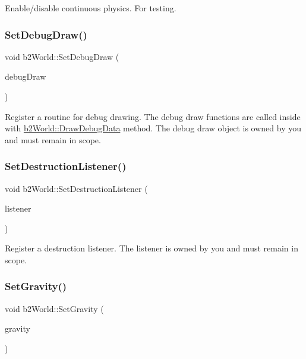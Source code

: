 Enable/disable continuous physics. For testing. 

\mbox{\label{classb2_world_a6976d2c67400df03c0d44174ffcfb7ee}} 
\subsubsection{\texorpdfstring{SetDebugDraw()}{SetDebugDraw()}}
{\footnotesize\ttfamily void b2\+World\+::\+Set\+Debug\+Draw (\begin{DoxyParamCaption}\item[{\mbox{\hyperlink{classb2_draw}{b2\+Draw}} $\ast$}]{debug\+Draw }\end{DoxyParamCaption})}

Register a routine for debug drawing. The debug draw functions are called inside with \mbox{\hyperlink{classb2_world_a293d9865e407fd463e168b0a29856acc}{b2\+World\+::\+Draw\+Debug\+Data}} method. The debug draw object is owned by you and must remain in scope. \mbox{\label{classb2_world_ae377f2dd5512ada7d27f4ad3541c75bf}} 
\subsubsection{\texorpdfstring{SetDestructionListener()}{SetDestructionListener()}}
{\footnotesize\ttfamily void b2\+World\+::\+Set\+Destruction\+Listener (\begin{DoxyParamCaption}\item[{\mbox{\hyperlink{classb2_destruction_listener}{b2\+Destruction\+Listener}} $\ast$}]{listener }\end{DoxyParamCaption})}

Register a destruction listener. The listener is owned by you and must remain in scope. \mbox{\label{classb2_world_aeafa43d6580e1dddb0675e672ca2375c}} 
\subsubsection{\texorpdfstring{SetGravity()}{SetGravity()}}
{\footnotesize\ttfamily void b2\+World\+::\+Set\+Gravity (\begin{DoxyParamCaption}\item[{const \mbox{\hyperlink{structb2_vec2}{b2\+Vec2}} \&}]{gravity }\end{DoxyParamCaption})\hspace{0.3cm}{\ttfamily [inline]}}



